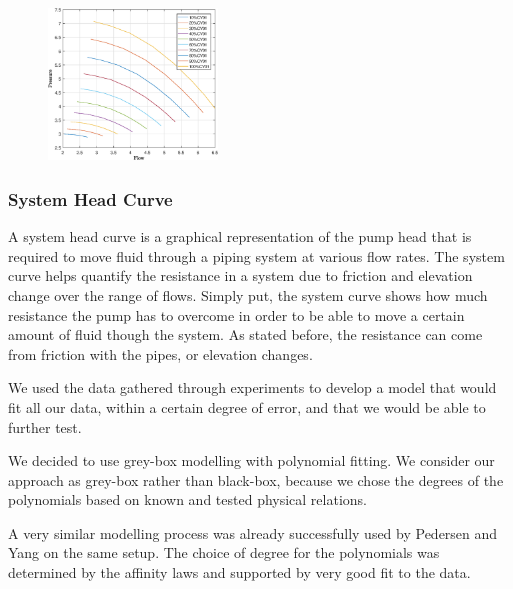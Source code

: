 \begin{figure}[H]
	\centering
	\includegraphics[width=0.4\textwidth]{figures/05mathematicalModeling/pumpCurves.eps}
\end{figure}

\newpage
\subsubsection{System Head Curve}
A system head curve is a graphical representation of the pump head that is required to move fluid through a piping system at various flow rates.
The system curve helps quantify the resistance in a system due to friction and elevation change over the range of flows. Simply put, the 
system curve shows how much resistance the pump has to overcome in order to be able to move a certain amount of fluid though the system.
As stated before, the resistance can come from friction with the pipes, or elevation changes.


We used the data gathered through experiments to develop a model that would fit all our data, within a certain degree of error, 
and that we would be able to further test.

We decided to use grey-box modelling with polynomial fitting.
We consider our approach as grey-box rather than black-box,
because we chose the degrees of the polynomials based on known and tested physical relations.

A very similar modelling process was already successfully used by Pedersen and Yang \cite{YangMultiPump2008} on the same setup.
The choice of degree for the polynomials was determined by the affinity laws \cite{Volk2014}
and supported by very good fit to the data.

